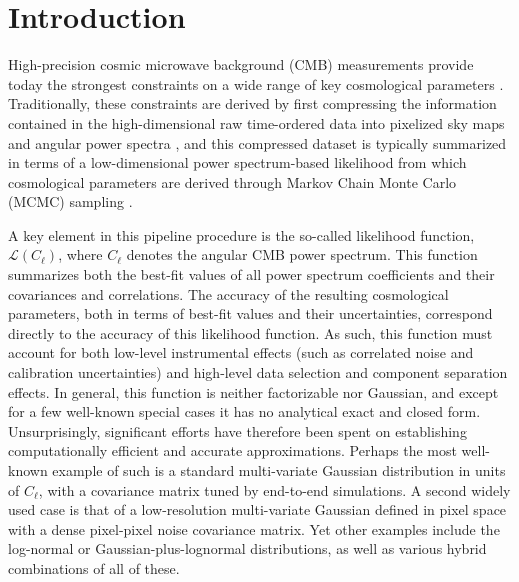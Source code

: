 \documentclass[twocolumn]{../common/aa}
\begin{document}

\maketitle





\section{Introduction}
\label{sec:introduction}

High-precision cosmic microwave background (CMB) measurements provide today the strongest constraints on a wide range of key cosmological parameters \citep[e.g.,][]{planck2016-l06}. Traditionally, these constraints are derived by first compressing the information contained in the high-dimensional raw time-ordered data into pixelized sky maps and angular power spectra \citep[e.g.,][]{bennett2012,planck2016-l02,planck2016-l03}, and this compressed dataset is typically summarized in terms of a low-dimensional power spectrum-based likelihood from which cosmological parameters are derived through Markov Chain Monte Carlo (MCMC) sampling \citep{cosmomc,planck2016-l05}.

A key element in this pipeline procedure is the so-called likelihood function, $\mathcal{L}(C_{\ell})$, where $C_{\ell}$ denotes the angular CMB power spectrum. This function summarizes both the best-fit values of all power spectrum coefficients and their covariances and correlations. The accuracy of the resulting cosmological parameters, both in terms of best-fit values and their uncertainties, correspond directly to the accuracy of this likelihood function. As such, this function must account for both low-level instrumental effects (such as correlated noise and calibration uncertainties) and high-level data selection and component separation effects. In general, this function is neither factorizable nor Gaussian, and except for a few well-known special cases it has no analytical exact and closed form. Unsurprisingly, significant efforts have therefore been spent on establishing computationally efficient and accurate approximations. Perhaps the most well-known example of such is a standard multi-variate Gaussian distribution in units of $C_{\ell}$, with a covariance matrix tuned by end-to-end simulations. A second widely used case is that of a low-resolution multi-variate Gaussian defined in pixel space with a dense pixel-pixel noise covariance matrix. Yet other examples include the log-normal or Gaussian-plus-lognormal distributions, as well as various hybrid combinations of all of these. 
\end{document}
